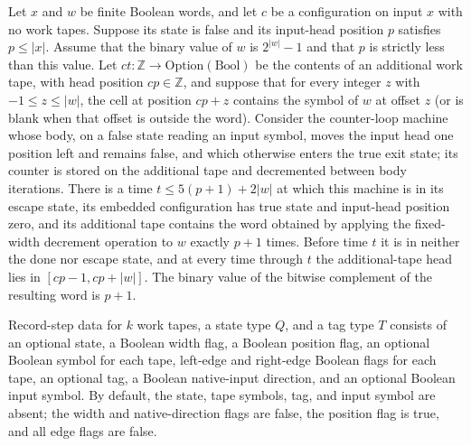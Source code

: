 \begin{theorem}
\label{Turing.recordStep_save_run}
\leanok
{}
Let $x$ and $w$ be finite Boolean words, and let $c$ be a configuration on input $x$
with no work tapes. Suppose its state is false and its input-head position $p$ satisfies
$p\le |x|$. Assume that the binary value of $w$ is $2^{|w|}-1$ and that $p$ is strictly
less than this value. Let $ct:\mathbb Z\to\mathrm{Option}(\mathrm{Bool})$ be the
contents of an additional work tape, with head position $cp\in\mathbb Z$, and suppose
that for every integer $z$ with $-1\le z\le |w|$, the cell at position $cp+z$ contains
the symbol of $w$ at offset $z$ (or is blank when that offset is outside the word).
Consider the counter-loop machine whose body, on a false state reading an input symbol,
moves the input head one position left and remains false, and which otherwise enters the
true exit state; its counter is stored on the additional tape and decremented between
body iterations. There is a time $t\le 5(p+1)+2|w|$ at which this machine is in its
escape state, its embedded configuration has true state and input-head position zero,
and its additional tape contains the word obtained by applying the fixed-width decrement
operation to $w$ exactly $p+1$ times. Before time $t$ it is in neither the done nor
escape state, and at every time through $t$ the additional-tape head lies in
$[cp-1,cp+|w|]$. The binary value of the bitwise complement of the resulting word is
$p+1$.
\end{theorem}

\begin{definition}
\label{Turing.RecordStepData}
\leanok
Record-step data for $k$ work tapes, a state type $Q$, and a tag type $T$ consists of an
optional state, a Boolean width flag, a Boolean position flag, an optional Boolean
symbol for each tape, left-edge and right-edge Boolean flags for each tape, an optional
tag, a Boolean native-input direction, and an optional Boolean input symbol. By default,
the state, tape symbols, tag, and input symbol are absent; the width and
native-direction flags are false, the position flag is true, and all edge flags are
false.
\end{definition}

